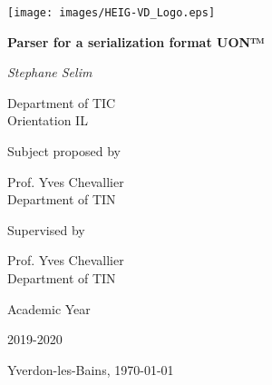 \documentclass[12pt]{article}
\begin{document}
\thispagestyle{empty}
\setlength\headheight{0pt} 
\begin{center}

\begin{center}
\texttt{[image: images/HEIG-VD\_Logo.eps]}            
\end{center}	

        \vspace*{\fill}
        {\Large\bfseries Parser for a serialization format UON™\par}
        
        \vspace{0.5cm}
        {\Large\itshape Stephane Selim\par}
        Department of TIC \\
        Orientation IL
        \vspace{0.25cm}

\vspace{1cm}
Subject proposed by\par
Prof. Yves Chevallier \\
Department of TIN\par

\vspace{1cm}
Supervised by\par
Prof. Yves Chevallier \\
Department of TIN\par

\vspace{1cm}
Academic Year\par
2019-2020\par

\large
\vfill
\begin{flushright}
Yverdon-les-Bains, \today
\end{flushright}

\vspace*{\fill}
\end{center}

\clearpage
\restoregeometry
\justify
\end{document}

